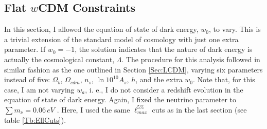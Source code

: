 
\subsection{Flat $w$CDM Constraints}\label{Sec:wCDM}
In this section, I allowed the equation of state of dark energy, $w_0$, to vary. This is a trivial extension of the standard model of cosmology with just one extra parameter. If $w_0 = -1$, the solution indicates that the nature of dark energy is actually the cosmological constant, $\Lambda$. The procedure for this analysis followed in similar fashion as the one outlined in Section \ref{Sec:LCDM}, varying six parameters instead of five: $\Omega_b$, $\Omega_{cdm}$, $n_s$, $\ln 10^{10} A_s$, $h$, and the extra $w_0$. Note that, for this case, I am not varying $w_a$, i. e., I do not consider a redshift evolution in the equation of state of dark energy. Again, I fixed the neutrino parameter to $\sum m_{\nu} = 0.06 \, eV$ \citep{2006NeutrinoReview,2014NeutrinoCosmoPlanck}. Here, I used the same $\ell_{max}^{5\%}$ cuts as in the last section (see table \ref{Tb:EllCuts}).

